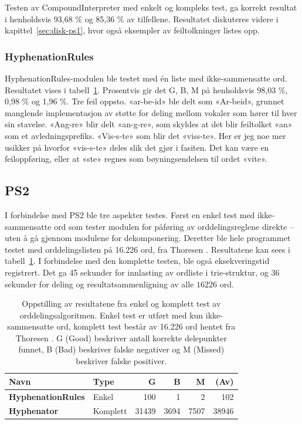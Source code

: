 Testen av CompoundInterpreter med enkelt og kompleks test, ga korrekt resultat i  henholdsvis 93,68 \% og 85,36 \% av tilfellene. Resultatet diskuteres videre i kapittel~\ref{sec:disk-ps1}, hvor også eksempler av feiltolkninger listes opp.

\subsubsection{HyphenationRules}

HyphenationRules-modulen ble testet med én liste med ikke-sammensatte ord. Resultatet vises i tabell~\ref{tab:hyphenation-results}. Prosentvis gir det G, B, M på henholdsvis 98,03 \%, 0,98 \% og 1,96 \%. Tre feil oppsto. «ar-be-id» ble delt som «Ar-beid», grunnet manglende implementasjon av støtte for deling mellom vokaler som hører til hver sin stavelse. «Ang-re» blir delt «an-g-re», som skyldes at det blir feiltolket «an» som et avledningsprefiks. «Vis-s-te» som blir det «viss-te». Her er jeg noe mer usikker på hvorfor «vis-s-te» deles slik det gjør i fasiten. Det kan være en feiloppføring, eller at «ste» regnes som bøyningsendelsen til ordet «vite».

\subsection{PS2}

I forbindelse med PS2 ble tre aspekter testes. Først en enkel test med ikke-sammensatte ord som tester modulen for påføring av orddelingsreglene direkte – uten å gå gjennom modulene for dekomponering. Deretter ble hele programmet testet med orddelingslisten på 16.226 ord, fra Thoresen \cite{thoresen1993virtuelle}. Resultatene kan sees i tabell~\ref{tab:hyphenation-results}. I forbindelse med den komplette testen, ble også eksekveringstid registrert. Det ga 45 sekunder for innlasting av ordliste i trie-struktur, og 36 sekunder for deling og resultatsammenligning av alle $16226$ ord. 

\begin{table}[h]
	\centering 
	\begin{tabular}{llrrrr} \hline 
		\textbf{Navn} & \textbf{Type} & \textbf{G} & \textbf{B} & \textbf{M} & \textbf{(Av)} \\
		\hline \textbf{HyphenationRules} & Enkel & 100 & 1 & 2 & 102 \\
		\hline \textbf{Hyphenator} & Komplett & 31439 & 3694 & 7507 & 38946 \\
		\hline 
	\end{tabular}
	\caption[Resultater fra test av Hyphenator-programmet]{Oppstilling av resultatene fra enkel og komplett test av orddelingsalgoritmen. Enkel test er utført med kun ikke-sammensatte ord, komplett test består av 16.226 ord hentet fra Thoresen \cite{thoresen1993virtuelle}. G (Good) beskriver antall korrekte delepunkter funnet, B (Bad) beskriver falske negativer og M (Missed) beskriver falske positiver.} \label{tab:hyphenation-results} 
\end{table}

